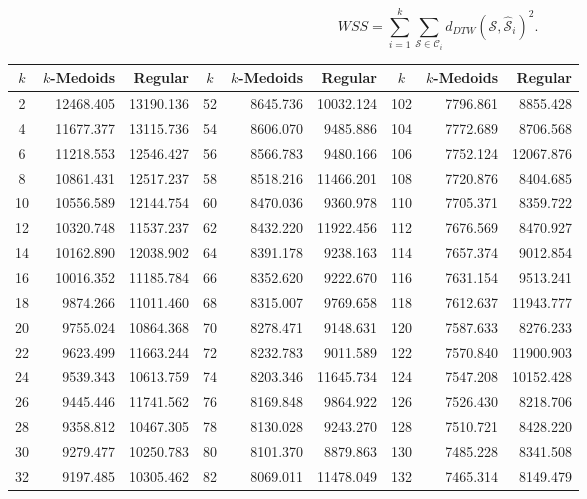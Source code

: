 \begin{equation}
    \label{Eq:WcSS}
    WSS = \sum_{i=1}^{k} \sum_{\mathcal{S} \in \mathcal{C}_{i}} d_{DTW} \left(\mathcal{S}, \mathcal{\hat{S}}_{i}\right)^{2}.
\end{equation}

\begin{table}[h]
	\centering
	\tiny
	\begin{tabular}{|c|r|r|c|r|r|c|r|r|}
		\hline
		$k$  & $k$-Medoids & Regular & $k$ & $k$-Medoids & Regular & $k$ & $k$-Medoids & Regular \\ \hline
		2  & 12468.405 & 13190.136 &  52 & 8645.736 & 10032.124 & 102 & 7796.861 &  8855.428 \\
		4  & 11677.377 & 13115.736 &  54 & 8606.070 &  9485.886 & 104 & 7772.689 &  8706.568 \\
		6  & 11218.553 & 12546.427 &  56 & 8566.783 &  9480.166 & 106 & 7752.124 & 12067.876 \\
		8  & 10861.431 & 12517.237 &  58 & 8518.216 & 11466.201 & 108 & 7720.876 &  8404.685 \\
		10 & 10556.589 & 12144.754 &  60 & 8470.036 &  9360.978 & 110 & 7705.371 &  8359.722 \\
		12 & 10320.748 & 11537.237 &  62 & 8432.220 & 11922.456 & 112 & 7676.569 &  8470.927 \\
		14 & 10162.890 & 12038.902 &  64 & 8391.178 &  9238.163 & 114 & 7657.374 &  9012.854 \\
		16 & 10016.352 & 11185.784 &  66 & 8352.620 &  9222.670 & 116 & 7631.154 &  9513.241 \\
		18 &  9874.266 & 11011.460 &  68 & 8315.007 &  9769.658 & 118 & 7612.637 & 11943.777 \\
		20 &  9755.024 & 10864.368 &  70 & 8278.471 &  9148.631 & 120 & 7587.633 &  8276.233 \\
		22 &  9623.499 & 11663.244 &  72 & 8232.783 &  9011.589 & 122 & 7570.840 & 11900.903 \\
		24 &  9539.343 & 10613.759 &  74 & 8203.346 & 11645.734 & 124 & 7547.208 & 10152.428 \\
		26 &  9445.446 & 11741.562 &  76 & 8169.848 &  9864.922 & 126 & 7526.430 &  8218.706 \\
		28 &  9358.812 & 10467.305 &  78 & 8130.028 &  9243.270 & 128 & 7510.721 &  8428.220 \\
		30 &  9279.477 & 10250.783 &  80 & 8101.370 &  8879.863 & 130 & 7485.228 &  8341.508 \\
		32 &  9197.485 & 10305.462 &  82 & 8069.011 & 11478.049 & 132 & 7465.314 &  8149.479 \\

\end{tabular}
\end{table}
